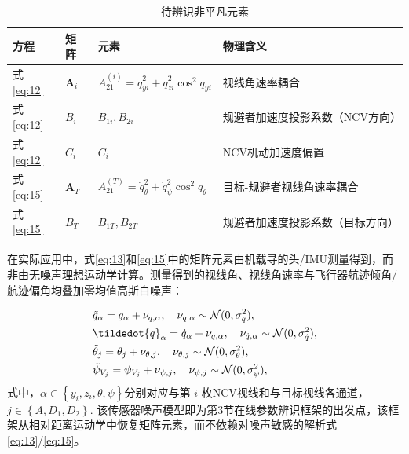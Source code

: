 \begin{table}[htbp]
\centering
\caption{待辨识非平凡元素}
\label{tab:nontrivial}
\small
\begin{tabularx}{\linewidth}{lXXX}
\toprule
方程 & 矩阵 & 元素 & 物理含义 \\
\midrule
式\eqref{eq:12} & ${{\mathbf{A}}_i}$ & $A_{21}^{(i)} = \dot q_{yi}^2 + \dot q_{zi}^2{\cos ^2}{q_{yi}}$ & 视线角速率耦合 \\
式\eqref{eq:12} & ${B_i}$ & ${B_{1i}},{B_{2i}}$ & 规避者加速度投影系数（NCV方向） \\
式\eqref{eq:12} & ${C_i}$ & ${C_i}$ & NCV机动加速度偏置 \\
式\eqref{eq:15} & ${{\mathbf{A}}_T}$ & $A_{21}^{(T)} = \dot q_\theta ^2 + \dot q_\psi ^2{\cos ^2}{q_\theta }$ & 目标-规避者视线角速率耦合 \\
式\eqref{eq:15} & ${B_T}$ & ${B_{1T}},{B_{2T}}$ & 规避者加速度投影系数（目标方向） \\
\bottomrule
\end{tabularx}
\end{table}
\begin{remarka}[测量噪声]
\label{rmk:meas-noise}
在实际应用中，式\eqref{eq:13}和\eqref{eq:15}中的矩阵元素由机载寻的头/IMU测量得到，而非由无噪声理想运动学计算。测量得到的视线角、视线角速率与飞行器航迹倾角/航迹偏角均叠加零均值高斯白噪声：
\end{remarka}
\begin{equation}
\label{eq:16}
\begin{gathered}
  \tilde{q}_{\alpha} = {q_{\alpha}} + {\nu _{q,\alpha }},\quad {\nu _{q,\alpha }}\sim \mathcal{N}(0,\sigma _q^2), \hfill \\
  \tildedot{q}_{\alpha} = \dot{q}_{\alpha} + {\nu _{\dot q,\alpha }},\quad {\nu _{\dot q,\alpha }}\sim \mathcal{N}(0,\sigma _{\dot q}^2), \hfill \\
  \tilde{\theta}_{j} = {\theta _{j}} + {\nu _{\theta ,j}},\quad {\nu _{\theta ,j}}\sim \mathcal{N}(0,\sigma _\theta ^2), \hfill \\
  \tilde{\psi}_{V_{j}} = {\psi _{V_{j}}} + {\nu _{\psi ,j}},\quad {\nu _{\psi ,j}}\sim \mathcal{N}(0,\sigma _\psi ^2), \hfill \\ 
\end{gathered}
\end{equation}
式中，$\alpha  \in \left\{ {{y_i},{z_i},\theta ,\psi } \right\}$分别对应与第 $i$ 枚NCV视线和与目标视线各通道，$j \in \left\{ {A,{D_1},{D_2}} \right\}$. 该传感器噪声模型即为第3节在线参数辨识框架的出发点，该框架从相对距离运动学中恢复矩阵元素，而不依赖对噪声敏感的解析式\eqref{eq:13}/\eqref{eq:15}。

